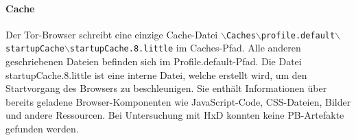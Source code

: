 \begin{appendices}
\paragraph*{Cache}
Der Tor-Browser schreibt eine einzige Cache-Datei \texttt{$\backslash$Caches$\backslash$profile.default$\backslash$\\startupCache$\backslash$startupCache.8.little} im Caches-Pfad. Alle anderen geschriebenen Dateien befinden sich im Profile.default-Pfad.
Die Datei \glqq{}startupCache.8.little\grqq{} ist eine interne Datei, welche erstellt wird, um den Startvorgang des Browsers zu beschleunigen. Sie enthält Informationen über bereits geladene Browser-Komponenten wie JavaScript-Code, CSS-Dateien, Bilder und andere Ressourcen. \cite{MozillaWiki.05.06.2023} 
Bei Untersuchung mit HxD konnten keine PB-Artefakte gefunden werden.


\end{appendices}
